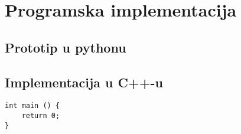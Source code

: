 \chapter{Programska implementacija}
\label{ch:implementacija}

\section{Prototip u pythonu}
\label{sec:pythonProto}

\section{Implementacija u C++-u}
\label{sec:implC++}
\lstset{language=C++, tabsize=2}
\begin{lstlisting}
int main () {
	return 0;
}
\end{lstlisting}